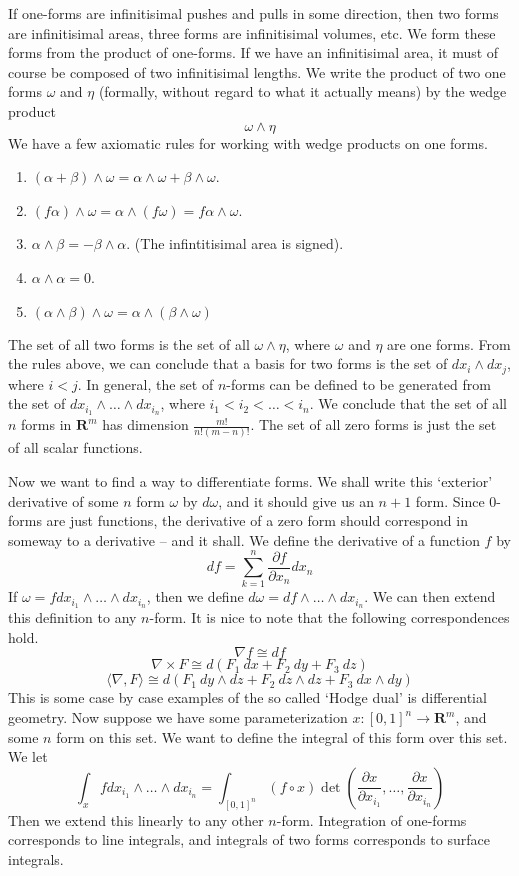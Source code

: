 If one-forms are infinitisimal pushes and pulls in some direction, then two forms are infinitisimal areas, three forms are infinitisimal volumes, etc. We form these forms from the product of one-forms. If we have an infinitisimal area, it must of course be composed of two infinitisimal lengths. We write the product of two one forms $\omega$ and $\eta$ (formally, without regard to what it actually means) by the wedge product
%
\[ \omega \wedge \eta \]
%
We have a few axiomatic rules for working with wedge products on one forms.
%
\begin{enumerate}
    \item $(\alpha + \beta) \wedge \omega = \alpha \wedge \omega + \beta \wedge \omega$.
    \item $(f \alpha) \wedge \omega = \alpha \wedge (f \omega) = f \alpha \wedge \omega$.
    \item $\alpha \wedge \beta = - \beta \wedge \alpha$. (The infintitisimal area is signed).
    \item $\alpha \wedge \alpha = 0$.
    \item $(\alpha \wedge \beta) \wedge \omega = \alpha \wedge (\beta \wedge \omega)$
\end{enumerate}
%
The set of all two forms is the set of all $\omega \wedge \eta$, where $\omega$ and $\eta$ are one forms. From the rules above, we can conclude that a basis for two forms is the set of $dx_i \wedge dx_j$, where $i < j$. In general, the set of $n$-forms can be defined to be generated from the set of $dx_{i_1} \wedge \dots \wedge dx_{i_n}$, where $i_1 < i_2 < \dots < i_n$. We conclude that the set of all $n$ forms in $\mathbf{R}^m$ has dimension $\frac{m!}{n!(m - n)!}$. The set of all zero forms is just the set of all scalar functions.

Now we want to find a way to differentiate forms. We shall write this `exterior' derivative of some $n$ form $\omega$ by $d\omega$, and it should give us an $n + 1$ form. Since 0-forms are just functions, the derivative of a zero form should correspond in someway to a derivative -- and it shall. We define the derivative of a function $f$ by
%
\[ df = \sum_{k = 1}^n \frac{\partial f}{\partial x_n} dx_n \]
%
If $\omega = f dx_{i_1} \wedge \dots \wedge dx_{i_n}$, then we define $d\omega = df \wedge \dots \wedge dx_{i_n}$. We can then extend this definition to any $n$-form. It is nice to note that the following correspondences hold.
%
\[ \nabla f \cong df \]
\[ \nabla \times F \cong d(F_1\ dx + F_2\ dy + F_3\ dz) \]
\[ \langle \nabla, F \rangle \cong d(F_1\ dy \wedge dz + F_2\ dz \wedge dz + F_3\ dx \wedge dy) \]
%
This is some case by case examples of the so called `Hodge dual' is differential geometry. Now suppose we have some parameterization $x:[0,1]^n \to \mathbf{R}^m$, and some $n$ form on this set. We want to define the integral of this form over this set. We let
%
\[ \int_x f dx_{i_1} \wedge \dots \wedge dx_{i_n} = \int_{[0,1]^n} (f \circ x) \det(\frac{\partial x}{\partial x_{i_1}}, \dots, \frac{\partial x}{\partial x_{i_n}}) \]
%
Then we extend this linearly to any other $n$-form. Integration of one-forms corresponds to line integrals, and integrals of two forms corresponds to surface integrals.

